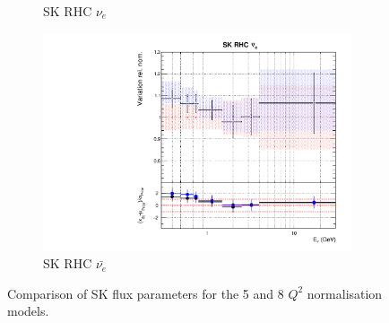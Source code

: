 \begin{figure}
\begin{subfigure}{0.45\textwidth}
  \caption{SK RHC $\nu_{e}$}
\end{subfigure}
\begin{subfigure}{0.45\textwidth}
  \centering
  \includegraphics[width=0.75\linewidth]{figs/comp5q2vs8q2flux15}
  \caption{SK RHC $\bar{\nu_e}$}
\end{subfigure}
\caption{Comparison of SK flux parameters for the 5 and 8 $Q^2$ normalisation models.}
\label{fig:comp5q2vs8q2fluxSK}
\end{figure}

